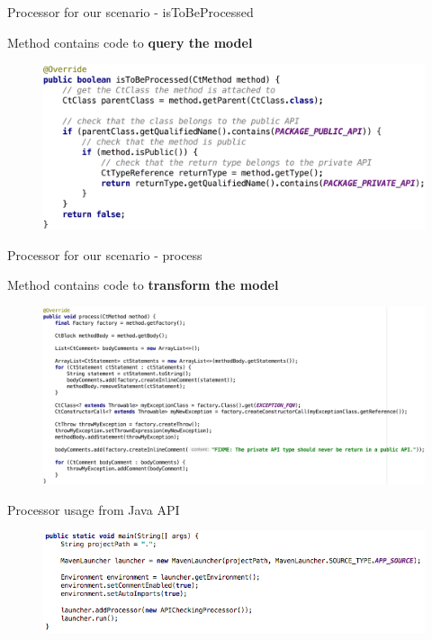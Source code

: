 \documentclass{beamer}
\begin{document}
\begin{frame}{Processor for our scenario - isToBeProcessed}

Method contains code to \textbf{query the model}
\begin{figure}
\centering
\includegraphics[width=\textwidth]{figures/processor/processor-is-to-be-processed.pdf}
\end{figure}
\end{frame}

\begin{frame}{Processor for our scenario - process}

Method contains code to \textbf{transform the model}
\begin{figure}
\centering
\includegraphics[width=\textwidth]{figures/processor/processor-process.pdf}
\end{figure}
\end{frame}

\begin{frame}{Processor usage from Java API}

\begin{figure}
\centering
\includegraphics[width=\textwidth]{figures/processor/running-processor.png}
\end{figure}
\end{frame}
\end{document}
